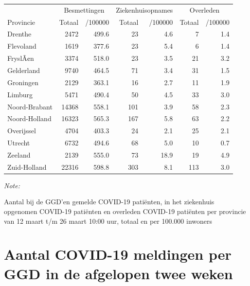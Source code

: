 \documentclass[
  english,
  man,floatsintext]{apa6}
\begin{document}
\begin{table}
\centering
\begin{threeparttable}
\begin{tabular}{lrrrrrr}
\toprule
\multicolumn{1}{c}{ } & \multicolumn{2}{c}{Besmettingen} & \multicolumn{2}{c}{Ziekenhuisopnames} & \multicolumn{2}{c}{Overleden} \\
\cmidrule(l{3pt}r{3pt}){2-3} \cmidrule(l{3pt}r{3pt}){4-5} \cmidrule(l{3pt}r{3pt}){6-7}
Provincie & Totaal & /100000 & Totaal & /100000 & Totaal & /100000\\
\midrule
Drenthe & 2472 & 499.6 & 23 & 4.6 & 7 & 1.4\\
Flevoland & 1619 & 377.6 & 23 & 5.4 & 6 & 1.4\\
FryslÃ¢n & 3374 & 518.0 & 23 & 3.5 & 21 & 3.2\\
Gelderland & 9740 & 464.5 & 71 & 3.4 & 31 & 1.5\\
Groningen & 2129 & 363.1 & 16 & 2.7 & 11 & 1.9\\
Limburg & 5471 & 490.4 & 50 & 4.5 & 33 & 3.0\\
Noord-Brabant & 14368 & 558.1 & 101 & 3.9 & 58 & 2.3\\
Noord-Holland & 16323 & 565.3 & 167 & 5.8 & 63 & 2.2\\
Overijssel & 4704 & 403.3 & 24 & 2.1 & 25 & 2.1\\
Utrecht & 6732 & 494.6 & 68 & 5.0 & 10 & 0.7\\
Zeeland & 2139 & 555.0 & 73 & 18.9 & 19 & 4.9\\
Zuid-Holland & 22316 & 598.8 & 303 & 8.1 & 113 & 3.0\\
\bottomrule
\end{tabular}
\begin{tablenotes}
\item \textit{Note: } 
\item Aantal bij de GGD’en gemelde COVID-19 patiënten, in het ziekenhuis opgenomen COVID-19 patiënten en overleden COVID-19 patiënten per provincie van 12 maart t/m 26 maart 10:00 uur, totaal en per 100.000 inwoners
\end{tablenotes}
\end{threeparttable}
\end{table}

\newpage

\hypertarget{aantal-covid-19-meldingen-per-ggd-in-de-afgelopen-twee-weken}{%
\section{Aantal COVID-19 meldingen per GGD in de afgelopen twee weken}\label{aantal-covid-19-meldingen-per-ggd-in-de-afgelopen-twee-weken}}
\end{document}
